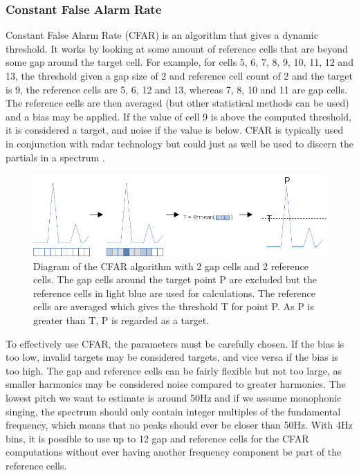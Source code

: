 \subsubsection{Constant False Alarm Rate}
Constant False Alarm Rate (CFAR) is an algorithm that gives a dynamic threshold. It works by looking at some amount of reference cells that are beyond some gap around the target cell. For example, for cells 5, 6, 7, 8, 9, 10, 11, 12 and 13, the threshold given a gap size of 2 and reference cell count of 2 and the target is 9, the reference cells are 5, 6, 12 and 13, whereas 7, 8, 10 and 11 are gap cells. The reference cells are then averaged (but other statistical methods can be used) and a bias may be applied. If the value of cell 9 is above the computed threshold, it is considered a target, and noise if the value is below. CFAR is typically used in conjunction with radar technology but could just as well be used to discern the partials in a spectrum \cite{Bruner2024}. 

\begin{figure}[ht]
    \centering
    \includegraphics[width=\textwidth]{./images/cfar.png}
    \caption{Diagram of the CFAR algorithm with 2 gap cells and 2 reference cells. The gap cells around the target point P are excluded but the reference cells in light blue are used for calculations. The reference cells are averaged which gives the threshold T for point P. As P is greater than T, P is regarded as a target.\label{fig:cfar}}
\end{figure}

To effectively use CFAR, the parameters must be carefully chosen. If the bias is too low, invalid targets may be considered targets, and vice versa if the bias is too high. The gap and reference cells can be fairly flexible but not too large, as smaller harmonics may be considered noise compared to greater harmonics. The lowest pitch we want to estimate is around 50Hz and if we assume monophonic singing, the spectrum should only contain integer multiples of the fundamental frequency, which means that no peaks should ever be closer than 50Hz. With 4Hz bins, it is possible to use up to 12 gap and reference cells for the CFAR computations without ever having another frequency component be part of the reference cells.  

